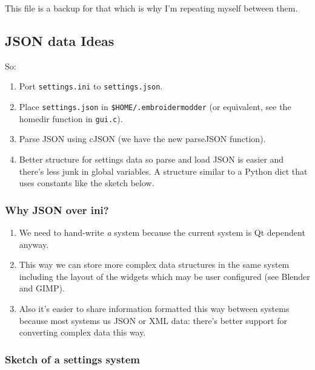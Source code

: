 \documentclass[a4paper, 11pt]{report}
\begin{document}
This file is a backup for that which is why I'm repeating myself between
them.

\hypertarget{json-data-ideas}{%
\subsection{JSON data Ideas}\label{json-data-ideas}}

So:

\begin{enumerate}
\def\labelenumi{\arabic{enumi}.}
\item
  Port \texttt{settings.ini} to \texttt{settings.json}.
\item
  Place \texttt{settings.json} in \texttt{\$HOME/.embroidermodder} (or
  equivalent, see the homedir function in \texttt{gui.c}).
\item
  Parse JSON using cJSON (we have the new parseJSON function).
\item
  Better structure for settings data so parse and load JSON is easier
  and there's less junk in global variables. A structure similar to a
  Python dict that uses constants like the sketch below.
\end{enumerate}

\hypertarget{why-json-over-ini}{%
\subsubsection{Why JSON over ini?}\label{why-json-over-ini}}

\begin{enumerate}
\def\labelenumi{\arabic{enumi}.}
\item
  We need to hand-write \emph{a} system because the current system is Qt
  dependent anyway.
\item
  This way we can store more complex data structures in the same system
  including the layout of the widgets which may be user configured (see
  Blender and GIMP).
\item
  Also it's easier to share information formatted this way between
  systems because most systems us JSON or XML data: there's better
  support for converting complex data this way.
\end{enumerate}

\hypertarget{sketch-of-a-settings-system}{%
\subsubsection{Sketch of a settings
system}\label{sketch-of-a-settings-system}}
\end{document}
